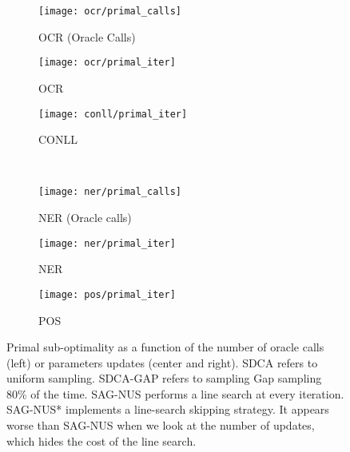 \begin{figure}[t]
\centering
\begin{subfigure}{0.33\linewidth}
\centering
\texttt{[image: ocr/primal\_calls]}
\caption{OCR (Oracle Calls)}\label{fig:OCR oracles}
\end{subfigure}%
\begin{subfigure}{0.33\linewidth}
\centering
\texttt{[image: ocr/primal\_iter]}
\caption{OCR}\label{fig:OCR}
\end{subfigure}%
\begin{subfigure}{0.33\linewidth}
\centering
\texttt{[image: conll/primal\_iter]}
\caption{CONLL}\label{fig:CONLL}
\end{subfigure} \\
\begin{subfigure}{0.33\linewidth}
\centering
\texttt{[image: ner/primal\_calls]}
\caption{NER (Oracle calls)}\label{fig:NER oracles}
\end{subfigure}%
\begin{subfigure}{0.33\linewidth}
\centering
\texttt{[image: ner/primal\_iter]}
\caption{NER}\label{fig:NER}
\end{subfigure}%
\begin{subfigure}{0.33\linewidth}
\centering
\texttt{[image: pos/primal\_iter]}
\caption{POS}\label{fig:POS}
\end{subfigure}%
\caption[Comparison of SDCA, SAG and OEG on 4 datasets]{Primal sub-optimality as a function of the number of oracle calls (left) or parameters updates (center and right).
	SDCA refers to uniform sampling.
	SDCA-GAP refers to sampling Gap sampling 80\% of the time.
	SAG-NUS performs a line search at every iteration.
	SAG-NUS* implements a line-search skipping strategy.
	It appears worse than SAG-NUS when we look at the number of updates, which hides the cost of the line search.
}
\label{fig:comparison with SAG and OEG}
\end{figure}

